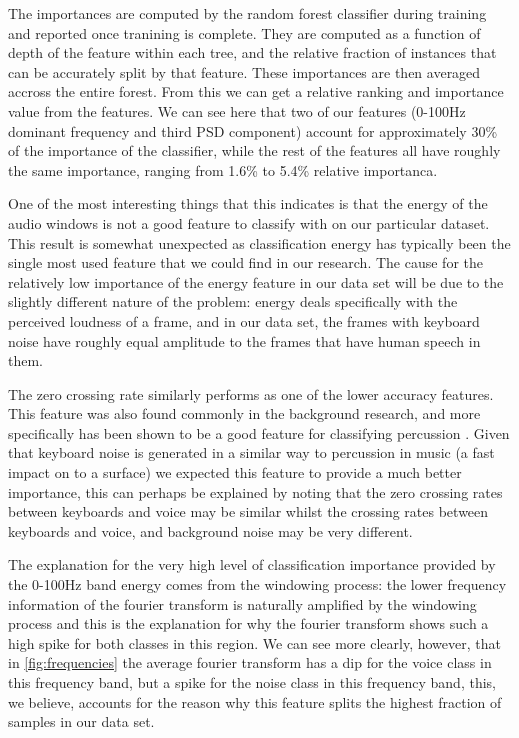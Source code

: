 \documentclass[ %
                    author={Sam Phippen},
                supervisor={Dr. Rafal Bogacz},
                     title={Real time voice activity detectors in noisy personal computing environments},
                  subtitle={},
                    degree={MEng},
                      year={2012} ]{thesis}
\begin{document}
The importances are computed by the random forest classifier during training
and reported once tranining is complete. They are computed as a function of
depth of the feature within each tree, and the relative fraction of instances
that can be accurately split by that feature. These importances are then
averaged accross the entire forest. From this we can get a relative ranking and
importance value from the features. We can see here that two of our features
(0-100Hz dominant frequency and third PSD component) account for approximately
30\% of the importance of the classifier, while the rest of the features all
have roughly the same importance, ranging from 1.6\% to 5.4\% relative
importanca.

One of the most interesting things that this indicates is that the
energy of the audio windows is not a good feature to classify with on our
particular dataset. This result is somewhat unexpected as classification energy
has typically been the single most used feature that we could find in our
research. The cause for the relatively low importance of the energy feature in
our data set will be due to the slightly different nature of the problem:
energy deals specifically with the perceived loudness of a frame, and in our
data set, the frames with keyboard noise have roughly equal amplitude to the
frames that have human speech in them.

The zero crossing rate similarly performs as one of the lower accuracy
features. This feature was also found commonly in the background research, and
more specifically has been shown to be a good feature for classifying
percussion \cite{gouyon}. Given that keyboard noise is generated in a similar
way to percussion in music (a fast impact on to a surface) we expected this
feature to provide a much better importance, this can perhaps be explained by
noting that the zero crossing rates between keyboards and voice may be similar
whilst the crossing rates between keyboards and voice, and background noise may
be very different.

The explanation for the very high level of classification importance provided
by the 0-100Hz band energy comes from the windowing process: the lower
frequency information of the fourier transform is naturally amplified by the
windowing process and this is the explanation for why the fourier transform
shows such a high spike for both classes in this region. We can see more
clearly, however, that in \ref{fig:frequencies} the average fourier transform
has a dip for the voice class in this frequency band, but a spike for the noise
class in this frequency band, this, we believe, accounts for the reason why
this feature splits the highest fraction of samples in our data set.
\end{document}
